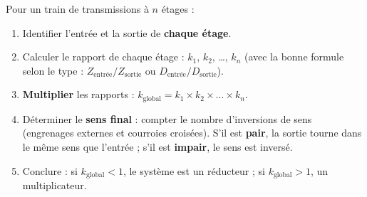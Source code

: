 \documentclass[11pt]{article}
\begin{document}
\begin{methode}
Pour un train de transmissions à $n$ étages :
\begin{enumerate}
\item Identifier l'entrée et la sortie de \textbf{chaque étage}.
\item Calculer le rapport de chaque étage : $k_1$, $k_2$, \dots, $k_n$ (avec la bonne formule selon le type : $Z_{\text{entrée}}/Z_{\text{sortie}}$ ou $D_{\text{entrée}}/D_{\text{sortie}}$).
\item \textbf{Multiplier} les rapports : $k_{\text{global}} = k_1 \times k_2 \times \dots \times k_n$.
\item Déterminer le \textbf{sens final} : compter le nombre d'inversions de sens (engrenages externes et courroies croisées). S'il est \textbf{pair}, la sortie tourne dans le même sens que l'entrée ; s'il est \textbf{impair}, le sens est inversé.
\item Conclure : si $k_{\text{global}} < 1$, le système est un réducteur ; si $k_{\text{global}} > 1$, un multiplicateur.
\end{enumerate}
\end{methode}
\end{document}
